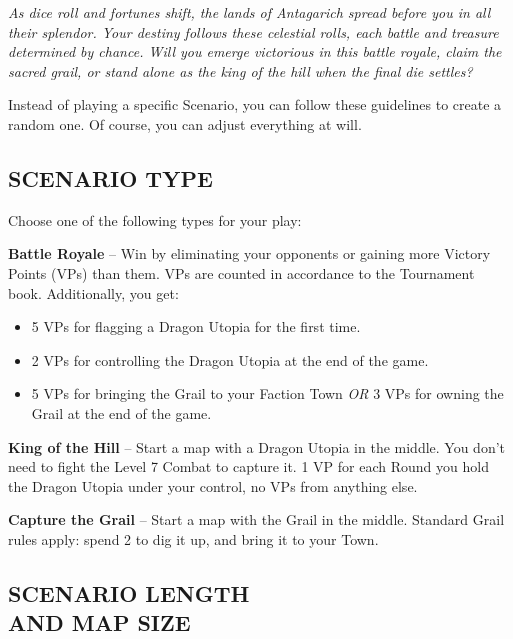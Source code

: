 
\begin{multicols*}{2}

\textit{As dice roll and fortunes shift, the lands of Antagarich spread before you in all their splendor.
  Your destiny follows these celestial rolls, each battle and treasure determined by chance.
  Will you emerge victorious in this battle royale, claim the sacred grail, or stand alone as the king of the hill when the final die settles?  %
}

Instead of playing a specific Scenario, you can follow these guidelines to create a random one.
Of course, you can adjust everything at will.

\subsection*{\MakeUppercase{Scenario Type}}

Choose one of the following types for your play:

\textbf{Battle Royale} -- Win by eliminating your opponents or gaining more Victory Points (VPs) than them.
VPs are counted in accordance to the Tournament book.
Additionally, you get:
\begin{itemize}
  \item 5 VPs for flagging a Dragon Utopia for the first time.
  \item 2 VPs for controlling the Dragon Utopia at the end of the game.
  \item 5 VPs for bringing the Grail to your Faction Town \textit{OR} 3 VPs for owning the Grail  at the end of the game.
\end{itemize}

\textbf{King of the Hill} -- Start a map with a Dragon Utopia in the middle.
You don't need to fight the Level 7 Combat to capture it.
1 VP for each Round you hold the Dragon Utopia under your control, no VPs from anything else.

\textbf{Capture the Grail} -- Start a map with the Grail in the middle.
Standard Grail rules apply: spend 2  to dig it up, and bring it to your Town.
\vspace*{\fill}
\columnbreak

\subsection*{\MakeUppercase{Scenario Length\\and Map Size}}


\end{multicols*}
